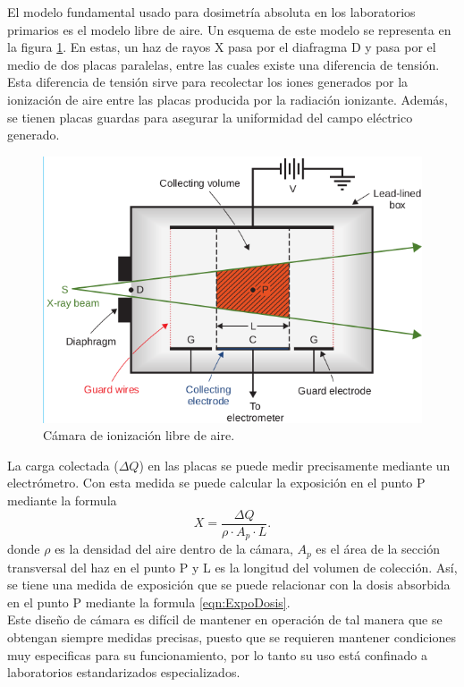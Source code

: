 El modelo fundamental usado para dosimetría absoluta en los laboratorios primarios es el modelo libre de aire. Un esquema de este modelo se representa en la figura  \ref{fig:freeAir}. En estas, un haz de rayos X pasa por el diafragma D y pasa por el medio de dos placas paralelas, entre las cuales existe una diferencia de tensión. Esta diferencia de tensión sirve para recolectar los iones generados por la ionización de aire entre las placas producida por la radiación ionizante. Además, se tienen placas guardas para asegurar la uniformidad del campo eléctrico generado.\\
\begin{figure}[H]
	\centering
	\includegraphics[width=0.7\linewidth]{images/freeAirChamber.png}
	\caption{Cámara de ionización libre de aire\cite{khan2014the}.}
	\label{fig:freeAir}
\end{figure}

La carga colectada ($\Delta Q$) en las placas se puede medir precisamente mediante un electrómetro. Con esta medida se puede calcular la exposición en el punto P mediante la formula 
 \begin{equation}
X=\frac{\Delta Q}{\rho \cdot A_{p}\cdot L}.
\end{equation}
donde $\rho$ es la densidad del aire dentro de la cámara, $A_{p}$ es el área de la sección transversal del haz en el punto P y L es la longitud del volumen de colección. Así, se tiene una medida de exposición que se puede relacionar con la dosis absorbida en el punto P mediante la formula \eqref{eqn:ExpoDosis}.\\

Este diseño de cámara es difícil de mantener en operación de tal manera que se obtengan siempre medidas precisas, puesto que se requieren mantener condiciones muy especificas para su funcionamiento, por lo tanto su uso está confinado a laboratorios estandarizados especializados.\\
 
